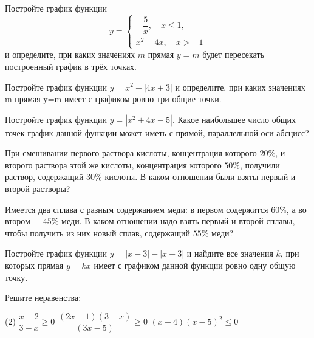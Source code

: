 \begin{class}[number=8]
	\begin{listofex}
		\item  Постройте график функции
		\[y=	 \left\{
		\begin{array}{l}
			-\dfrac{5}{x}, \quad x\leq1,\\
			x^2-4x, \quad x>-1
		\end{array}
		\right. \]
		и определите, при каких значениях \( m \) прямая \( y=m \) будет пересекать построенный график в трёх точках.
		\item Постройте график функции \( y=x^2-|4x+3| \) и определите, при каких значениях m прямая y=m имеет с графиком ровно три общие точки.
		\item Постройте график функции \( y=|x^2+4x-5| \). Какое наибольшее число общих точек график данной функции может иметь с прямой, параллельной оси абсцисс?
		\item При смешивании первого раствора кислоты, концентрация которого \( 20\% \), и второго раствора этой же кислоты, концентрация которого \( 50\% \), получили раствор, содержащий \( 30\% \) кислоты. В каком отношении были взяты первый и второй растворы?
		\item Имеется два сплава с разным содержанием меди: в первом содержится \( 60\% \), а во втором --- \( 45\% \) меди. В каком отношении надо взять первый и второй сплавы, чтобы получить из них новый сплав, содержащий \( 55\% \) меди?
		\item Постройте график функции \( y = |x-3|-|x+3 \)| и найдите все значения \( k \), при которых прямая \( y = kx \) имеет с графиком данной функции ровно одну общую точку.
		\item Решите неравенства: 
		\begin{tasks}(2)
			\task \( \dfrac{x-2}{3-x}\geq0 \)		
			\task  \( \dfrac{(2x-1)(3-x)}{(3x-5)}\geq0  \)
			\task \( (x-4)(x-5)^2\leq0 \)
		\end{tasks} 
	\end{listofex}
\end{class}
